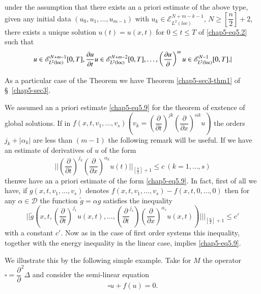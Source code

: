  \begin{theorem}\label{chap5-sec5-thm2}%
 under the assumption that there exists an a priori estimate of the
 above type, given any initial data $(u_0, u_1, \ldots, u_{m-1})$ with
 $u_k \in \mathscr{E}^{N + m- k-1}_{L^2  (loc)}$, $N \geq \left[
   \dfrac{n}{2}\right] + 2$, there exists a unique solution $u(t) = u (x,
 t)$ for $0 \leq t \leq T$ of \eqref{chap5-eq5.2} such that  
$$
u \in \mathscr{E}^{N + m- 1}_{L^2  (\operatorname{loc})} [0, T],
\frac{\partial u}{\partial t}  u \in \mathscr{E}^{N + m-
  2}_{L^2  (\operatorname{loc})} [0, T], \ldots, \left(\frac{\partial u}{\partial
}\right)^{m} u \in \mathscr{E}^{N- 1}_{L^2  (\operatorname{loc})} [0, T].| 
$$
\end{theorem} 

\setcounter{remark}{0}
\begin{remark}\label{chap5-sec5-rem1}%
As a particular case of the Theorem we have Theorem
\ref{chap5-sec3-thm1} of \S\ \ref{chap5-sec3}.  
\end{remark}

\begin{remark}\label{chap5-sec5-rem2}%
We assumed an a priori estimate \eqref{chap5-eq5.9} for the theorem of
exstence of 
global solutions. If in $f (x, t, v_1, \ldots, v_s) \left(v_k =
\left(\dfrac{\partial }{\partial t}\right)^{jk}\left(\dfrac{\partial }{\partial
  x}\right)^{\alpha k} u\right)$ the orders $j_k + |\alpha_k|$ are less than
$(m-1)$ the following remark will be useful. If we have an estimate of
derivatives of $u$ of the form  
$$
||\left(\frac{\partial }{\partial t}\right)^{j_k}\left(\frac{\partial }{\partial
  x}\right)^{\alpha_k} u(t)||_{[\frac{n}{2}] + 1} \leq c\ (k = 1, \ldots, s) 
$$
then\pageoriginale we have an a priori estimate of the form
\eqref{chap5-eq5.9}. In fact, first of 
all we have, if $g (x, t, v_1, \ldots, v_s)$ denotes $f(x, t, v_1,
\ldots, v_s) - f (x, t, 0, \ldots, 0)$ then for any $\alpha \in
\mathscr{D}$ the function $\tilde{g} = \alpha  g $ satisfies the
inequality  
$$
|| \tilde{g} \left( x, t, \left(\frac{\partial }{\partial
  t}\right)^{j_1} u (x, t), \ldots, \left(\frac{\partial }{\partial t}
^{j_s}\right)\left(\frac{\partial}{\partial 
  x}\right)^{\alpha _s} u (x, t)\right)|||_{[\frac{n}{2}]+1}\leq c' 
$$
with a constant $c'$. Now as in the case of first order systems this
inequality, together with the energy inequality in the linear case,
implies \eqref{chap5-eq5.9}.  
\end{remark}

We illustrate this by the following simple example. Take for $M$ the
operator $\square = \dfrac{\partial}{\partial}^2  \Delta$ and consider
the semi-linear equation  
$$
\square u + f (u) = 0. 
$$


